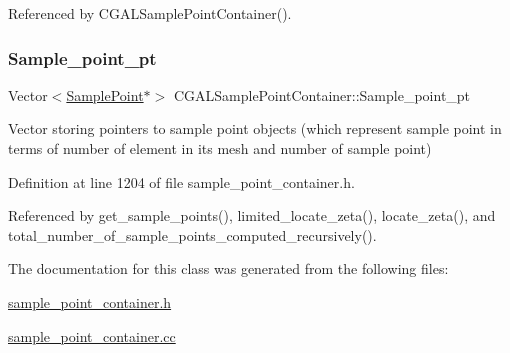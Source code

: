 Referenced by C\+G\+A\+L\+Sample\+Point\+Container().

\mbox{\label{classCGALSamplePointContainer_a806c0488f0d6920ca835e4f62dadd337}} 
\subsubsection{\texorpdfstring{Sample\+\_\+point\+\_\+pt}{Sample\_point\_pt}}
{\footnotesize\ttfamily Vector$<$\hyperlink{classSamplePoint}{Sample\+Point}$\ast$$>$ C\+G\+A\+L\+Sample\+Point\+Container\+::\+Sample\+\_\+point\+\_\+pt\hspace{0.3cm}{\ttfamily [private]}}

Vector storing pointers to sample point objects (which represent sample point in terms of number of element in its mesh and number of sample point) 

Definition at line 1204 of file sample\+\_\+point\+\_\+container.\+h.



Referenced by get\+\_\+sample\+\_\+points(), limited\+\_\+locate\+\_\+zeta(), locate\+\_\+zeta(), and total\+\_\+number\+\_\+of\+\_\+sample\+\_\+points\+\_\+computed\+\_\+recursively().



The documentation for this class was generated from the following files\+:\begin{DoxyCompactItemize}
\item 
\hyperlink{sample__point__container_8h}{sample\+\_\+point\+\_\+container.\+h}\item 
\hyperlink{sample__point__container_8cc}{sample\+\_\+point\+\_\+container.\+cc}\end{DoxyCompactItemize}
